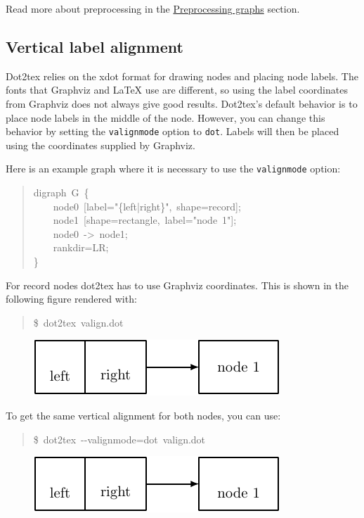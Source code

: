 \documentclass[10pt,a4paper,english]{article}
\begin{document}
Read more about preprocessing in the \href{\#preprocessing-graphs}{Preprocessing graphs} section.



\hypertarget{vertical-label-alignment}{}
\subsection*{Vertical label alignment}
\label{vertical-label-alignment}

Dot2tex relies on the xdot format for drawing nodes and placing node labels. The fonts that Graphviz and LaTeX use are different, so using the label coordinates from Graphviz does not always give good results. Dot2tex's default behavior is to place node labels in the middle of the node. However, you can change this behavior by setting the \texttt{valignmode} option to \texttt{dot}. Labels will then be placed using the coordinates supplied by Graphviz.

Here is an example graph where it is necessary to use the \texttt{valignmode} option:
\begin{quote}{\ttfamily \raggedright \noindent
digraph~G~{\{}~\\
~~~~node0~{[}label="{\{}left|right{\}}",~shape=record{]};~\\
~~~~node1~{[}shape=rectangle,~label="node~1"{]};~\\
~~~~node0~->~node1;~\\
~~~~rankdir=LR;~\\
{\}}
}\end{quote}

For record nodes dot2tex has to use Graphviz coordinates. This is shown in the following figure rendered with:
\begin{quote}{\ttfamily \raggedright \noindent
{\$}~dot2tex~valign.dot
}\end{quote}
\begin{figure}[H]
\centering

\includegraphics{pdf/valignmode0}
\end{figure}

To get the same vertical alignment for both nodes, you can use:
\begin{quote}{\ttfamily \raggedright \noindent
{\$}~dot2tex~-{}-valignmode=dot~valign.dot
}\end{quote}
\begin{figure}[H]
\centering

\includegraphics{pdf/valignmode1}
\end{figure}
\end{document}
